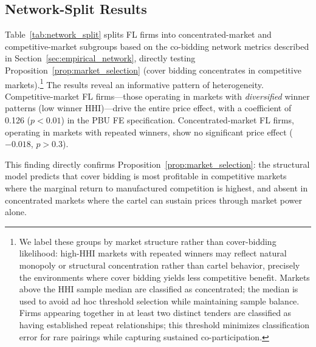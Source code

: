 




\subsection{Network-Split Results}
\label{sec:results_network}

Table~\ref{tab:network_split} splits FL firms into
concentrated-market and competitive-market subgroups based on the
co-bidding network metrics described in
Section~\ref{sec:empirical_network}, directly testing
Proposition~\ref{prop:market_selection} (cover bidding concentrates in
competitive markets).\footnote{We label these groups by
market structure rather than cover-bidding likelihood: high-HHI markets
with repeated winners may reflect natural monopoly or structural
concentration rather than cartel behavior, precisely the environments
where cover bidding yields less competitive benefit.
Markets above the HHI sample median are classified as concentrated;
the median is used to avoid ad hoc threshold selection while maintaining
sample balance. Firms appearing together in at least two distinct
tenders are classified as having established repeat relationships;
this threshold minimizes classification error for rare pairings while
capturing sustained co-participation.}
The results reveal an informative pattern of heterogeneity.
Competitive-market FL firms---those operating in markets with
\emph{diversified} winner patterns (low winner HHI)---drive the entire
price effect, with a coefficient of 0.126 ($p < 0.01$) in the PBU FE
specification. Concentrated-market FL firms, operating in markets with
repeated winners, show no significant price effect ($-0.018$, $p > 0.3$).

This finding directly confirms Proposition~\ref{prop:market_selection}:
the structural model predicts that cover bidding is most profitable in
competitive markets where the marginal return to manufactured
competition is highest, and absent in concentrated markets where the
cartel can sustain prices through market power alone.




